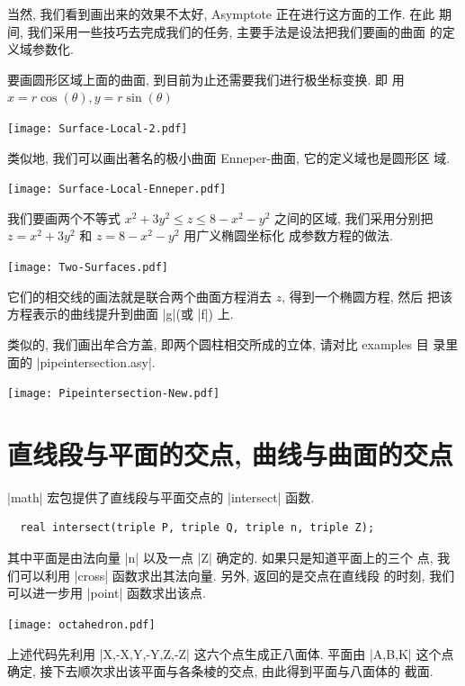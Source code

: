 \documentclass[nofonts,CJKnormalspaces]{ctexbook}[2009/05/20]
\let\leq\leqslant
\begin{document}
当然, 我们看到画出来的效果不太好, Asymptote 正在进行这方面的工作. 在此
期间, 我们采用一些技巧去完成我们的任务, 主要手法是设法把我们要画的曲面
的定义域参数化.

要画圆形区域上面的曲面, 到目前为止还需要我们进行极坐标变换. 即
用 \label{surface:local}
$x=r\cos(\theta),y=r\sin(\theta)$
\begin{center}\texttt{[image: Surface-Local-2.pdf]}\end{center}%

类似地, 我们可以画出著名的极小曲面 Enneper-曲面, 它的定义域也是圆形区
域.
\begin{center}\texttt{[image: Surface-Local-Enneper.pdf]}\end{center}%



我们要画两个不等式 $x^{2}+3y^{2}\leq z \leq 8-x^{2}-y^{2}$ 之间的区域,
我们采用分别把 $z=x^{2}+3y^{2}$ 和 $z=8-x^{2}-y^{2}$ 用广义椭圆坐标化
成参数方程的做法.
\begin{center}\texttt{[image: Two-Surfaces.pdf]}\end{center}%

它们的相交线的画法就是联合两个曲面方程消去 $z$, 得到一个椭圆方程, 然后
把该方程表示的曲线提升到曲面 |g|(或 |f|) 上.

类似的, 我们画出牟合方盖, 即两个圆柱相交所成的立体, 请对比 examples 目
录里面的 |pipeintersection.asy|.
\begin{center}\texttt{[image: Pipeintersection-New.pdf]}\end{center}%





\section{直线段与平面的交点, 曲线与曲面的交点}
|math| 宏包提供了直线段与平面交点的 |intersect| 函数.
\begin{lstlisting}
  real intersect(triple P, triple Q, triple n, triple Z);
\end{lstlisting}
其中平面是由法向量 |n| 以及一点 |Z| 确定的. 如果只是知道平面上的三个
点, 我们可以利用 |cross| 函数求出其法向量. 另外, 返回的是交点在直线段
的时刻, 我们可以进一步用 |point| 函数求出该点.

\begin{center}\texttt{[image: octahedron.pdf]}\end{center}%

上述代码先利用 |X,-X,Y,-Y,Z,-Z| 这六个点生成正八面体. 平面由 |A,B,K|
这个点确定, 接下去顺次求出该平面与各条棱的交点, 由此得到平面与八面体的
截面.
\end{document}
